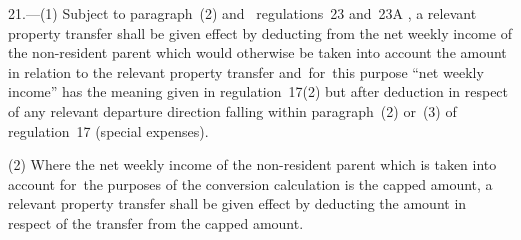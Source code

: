 \documentclass[12pt,a4paper]{article}
\begin{document}
21.---(1)  Subject to paragraph~(2) and~
regulations~23 and~23A%
, a relevant property transfer shall be given effect by deducting from the net weekly income of the non-resident parent which would otherwise be taken into account the amount in relation to the relevant property transfer and~for~this purpose “net weekly income” has the meaning given in regulation~17(2) but after deduction in respect of any relevant departure direction falling within paragraph~(2) or~(3) of regulation~17 (special expenses).

(2) Where the net weekly income of the non-resident parent which is taken into account for~the purposes of the conversion calculation is the capped amount, a relevant property transfer shall be given effect by deducting the amount in respect of the transfer from the capped amount.


\vfill

\subsection[22. Effect on conversion calculation—maximum amount payable where relevant departure direction is on additional cases ground]{}
\end{document}
